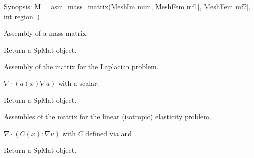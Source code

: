 \documentclass[a4paper,11pt,english]{sphinxmanual}
\begin{document}

\begin{fulllineitems}
\label{\detokenize{python/cmdref_Module asm:getfem.asm_mass_matrix}}
Synopsis: M = asm\_mass\_matrix(MeshIm mim, MeshFem mf1{[}, MeshFem mf2{[}, int region{]}{]})

Assembly of a mass matrix.

Return a SpMat object.

\end{fulllineitems}


\begin{fulllineitems}
\label{\detokenize{python/cmdref_Module asm:getfem.asm_laplacian}}
Assembly of the matrix for the Laplacian problem.

\(\nabla\cdot(a(x)\nabla u)\)  with  a scalar.

Return a SpMat object.

\end{fulllineitems}


\begin{fulllineitems}
\label{\detokenize{python/cmdref_Module asm:getfem.asm_linear_elasticity}}
Assembles of the matrix for the linear (isotropic) elasticity problem.

\(\nabla\cdot(C(x):\nabla u)\)
with \(C\) defined via  and .

Return a SpMat object.

\end{fulllineitems}
\end{document}
